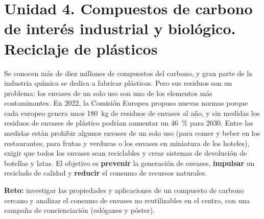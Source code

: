 \section[Unidad 4. Compuestos de carbono y plásticos]{Unidad 4. Compuestos de carbono de interés industrial y biológico. Reciclaje de plásticos}

Se conocen más de diez millones de compuestos del carbono, y gran parte de la industria química se dedica a fabricar plásticos. Pero sus residuos son un problema: los envases de un solo uso son uno de los elementos más contaminantes. En 2022, la Comisión Europea propuso nuevas normas porque cada europeo genera unos \qty{180}{\kg} de residuos de envases al año, y sin medidas los residuos de envases de plástico podrían aumentar un \qty{46}{\percent} para 2030. Entre las medidas están prohibir algunos envases de un solo uso (para comer y beber en los restaurantes, para frutas y verduras o los envases en miniatura de los hoteles), exigir que todos los envases sean reciclables y crear sistemas de devolución de botellas y latas. El objetivo es \textbf{prevenir} la generación de envases, \textbf{impulsar} un reciclado de calidad y \textbf{reducir} el consumo de recursos naturales.

\begin{marker}
    \textbf{Reto:} investigar las propiedades y aplicaciones de un compuesto de carbono cercano y analizar el consumo de envases no reutilizables en el centro, con una campaña de concienciación (eslóganes y póster).
\end{marker}

